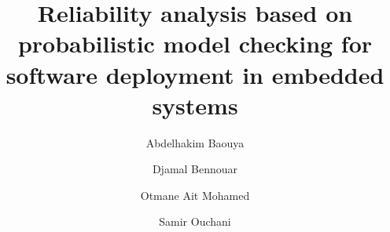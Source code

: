 \documentclass[3p,times,procedia,authoryear,round]{elsarticle}
\begin{document}
\begin{frontmatter}



\dochead{}

\title{
Reliability analysis based on probabilistic model checking for software deployment in embedded systems}

\author[aut1]{Abdelhakim Baouya}
\author[aut2]{Djamal Bennouar}
\author[aut3]{Otmane Ait Mohamed}
\author[aut4]{Samir Ouchani}

\address[aut1]{University of BLIDA 1 , Blida , Algeria, LIMPAF \& LRDSI Lab, CS Department}
\address[aut2]{University of Bouira, Algeria, LIMPAF Lab, CS Department}
\address[aut3]{Concordia University, Montr\'{e}al, Canada, ECE Department}
\address[aut4]{University of Luxembourg, Luxembourg, SnT Center}


\end{frontmatter}
\end{document}
